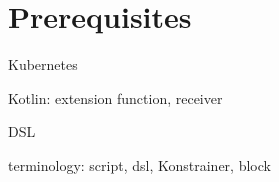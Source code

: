 \setlength{\parindent}{0pt}
\setlength{\parskip}{0.6em}

\chapter{Prerequisites}
\label{chap:prerequisites}

Kubernetes

Kotlin: extension function, receiver

DSL

terminology: script, dsl, Konstrainer, block
